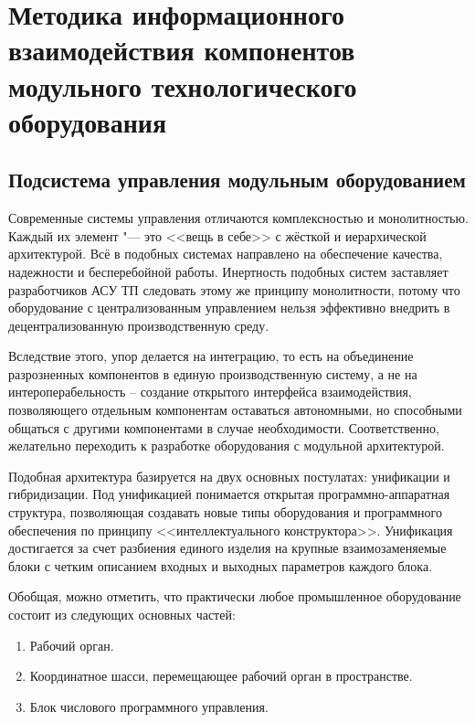 \chapter{Методика информационного взаимодействия компонентов модульного технологического оборудования}\label{ch:ch3}

\section{Подсистема управления модульным оборудованием}\label{sec:ch3/sec1}

Современные системы управления отличаются комплексностью и монолитностью. Каждый их элемент "--- это <<вещь в себе>> с жёсткой и иерархической архитектурой. Всё в подобных системах направлено на обеспечение качества, надежности и бесперебойной работы. Инертность подобных систем заставляет разработчиков АСУ ТП следовать этому же принципу монолитности, потому что оборудование с централизованным управлением нельзя эффективно внедрить в децентрализованную производственную среду.

Вследствие этого, упор делается на интеграцию, то есть на объединение разрозненных компонентов в единую производственную систему, а не на интероперабельность – создание открытого интерфейса взаимодействия, позволяющего отдельным компонентам оставаться автономными, но способными общаться с другими компонентами в случае необходимости. Соответственно, желательно переходить к разработке оборудования с модульной архитектурой.

Подобная архитектура базируется на двух основных постулатах: унификации и гибридизации. Под унификацией понимается открытая программно-аппаратная структура, позволяющая создавать новые типы оборудования и программного обеспечения по принципу <<интеллектуального конструктора>>. Унификация достигается за счет разбиения единого изделия на крупные взаимозаменяемые блоки с четким описанием входных и выходных параметров каждого блока.

Обобщая, можно отметить, что практически любое промышленное оборудование состоит из следующих основных частей:

\begin{enumerate}
	\item Рабочий орган.
	\item Координатное шасси, перемещающее рабочий орган в пространстве.
	\item Блок числового программного управления.
\end{enumerate}

